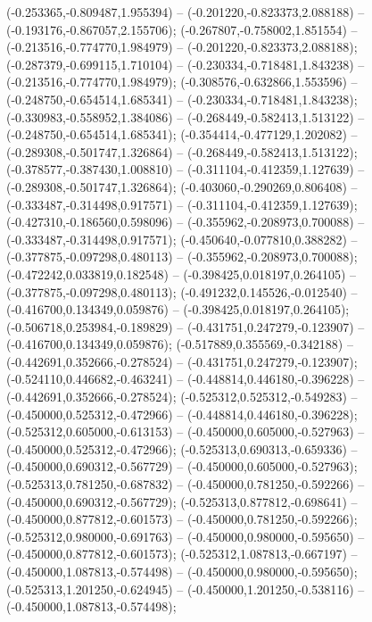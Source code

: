  (-0.253365,-0.809487,1.955394) -- (-0.201220,-0.823373,2.088188) -- (-0.193176,-0.867057,2.155706);
 (-0.267807,-0.758002,1.851554) -- (-0.213516,-0.774770,1.984979) -- (-0.201220,-0.823373,2.088188);
 (-0.287379,-0.699115,1.710104) -- (-0.230334,-0.718481,1.843238) -- (-0.213516,-0.774770,1.984979);
 (-0.308576,-0.632866,1.553596) -- (-0.248750,-0.654514,1.685341) -- (-0.230334,-0.718481,1.843238);
 (-0.330983,-0.558952,1.384086) -- (-0.268449,-0.582413,1.513122) -- (-0.248750,-0.654514,1.685341);
 (-0.354414,-0.477129,1.202082) -- (-0.289308,-0.501747,1.326864) -- (-0.268449,-0.582413,1.513122);
 (-0.378577,-0.387430,1.008810) -- (-0.311104,-0.412359,1.127639) -- (-0.289308,-0.501747,1.326864);
 (-0.403060,-0.290269,0.806408) -- (-0.333487,-0.314498,0.917571) -- (-0.311104,-0.412359,1.127639);
 (-0.427310,-0.186560,0.598096) -- (-0.355962,-0.208973,0.700088) -- (-0.333487,-0.314498,0.917571);
 (-0.450640,-0.077810,0.388282) -- (-0.377875,-0.097298,0.480113) -- (-0.355962,-0.208973,0.700088);
 (-0.472242,0.033819,0.182548) -- (-0.398425,0.018197,0.264105) -- (-0.377875,-0.097298,0.480113);
 (-0.491232,0.145526,-0.012540) -- (-0.416700,0.134349,0.059876) -- (-0.398425,0.018197,0.264105);
 (-0.506718,0.253984,-0.189829) -- (-0.431751,0.247279,-0.123907) -- (-0.416700,0.134349,0.059876);
 (-0.517889,0.355569,-0.342188) -- (-0.442691,0.352666,-0.278524) -- (-0.431751,0.247279,-0.123907);
 (-0.524110,0.446682,-0.463241) -- (-0.448814,0.446180,-0.396228) -- (-0.442691,0.352666,-0.278524);
 (-0.525312,0.525312,-0.549283) -- (-0.450000,0.525312,-0.472966) -- (-0.448814,0.446180,-0.396228);
 (-0.525312,0.605000,-0.613153) -- (-0.450000,0.605000,-0.527963) -- (-0.450000,0.525312,-0.472966);
 (-0.525313,0.690313,-0.659336) -- (-0.450000,0.690312,-0.567729) -- (-0.450000,0.605000,-0.527963);
 (-0.525313,0.781250,-0.687832) -- (-0.450000,0.781250,-0.592266) -- (-0.450000,0.690312,-0.567729);
 (-0.525313,0.877812,-0.698641) -- (-0.450000,0.877812,-0.601573) -- (-0.450000,0.781250,-0.592266);
 (-0.525312,0.980000,-0.691763) -- (-0.450000,0.980000,-0.595650) -- (-0.450000,0.877812,-0.601573);
 (-0.525312,1.087813,-0.667197) -- (-0.450000,1.087813,-0.574498) -- (-0.450000,0.980000,-0.595650);
 (-0.525313,1.201250,-0.624945) -- (-0.450000,1.201250,-0.538116) -- (-0.450000,1.087813,-0.574498);
